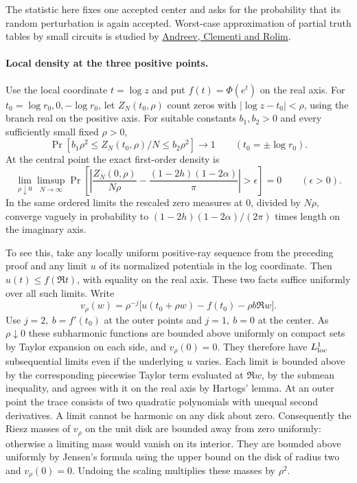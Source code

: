The statistic here fixes one accepted center and asks for the probability that its random perturbation is again accepted. Worst-case approximation of partial truth tables by small circuits is studied by \href{https://eccc.weizmann.ac.il/eccc-reports/1995/TR95-041/index.html}{Andreev, Clementi and Rolim}.

\paragraph{Local density at the three positive points.}
Use the local coordinate \(t=\log z\) and put \(f(t)=\Phi(e^t)\) on the real axis. For \(t_0=\log r_0,0,-\log r_0\), let \(Z_N(t_0,\rho)\) count zeros with \(|\log z-t_0|<\rho\), using the branch real on the positive axis. For suitable constants \(b_1,b_2>0\) and every sufficiently small fixed \(\rho>0\),
\[
 \Pr\!\left[b_1\rho^2\le Z_N(t_0,\rho)/N\le b_2\rho^2\right]\longrightarrow1
 \qquad(t_0=\pm\log r_0).
\]
At the central point the exact first-order density is
\[
 \lim_{\rho\downarrow0}\limsup_{N\to\infty}
 \Pr\!\left[\left|\frac{Z_N(0,\rho)}{N\rho}
            -\frac{(1-2h)(1-2\alpha)}{\pi}\right|>\epsilon\right]=0
 \qquad(\epsilon>0).
\]
In the same ordered limits the rescaled zero measures at \(0\), divided by \(N\rho\), converge vaguely in probability to \((1-2h)(1-2\alpha)/(2\pi)\) times length on the imaginary axis.

To see this, take any locally uniform positive-ray sequence from the preceding proof and any limit \(u\) of its normalized potentials in the log coordinate. Then \(u(t)\le f(\Re t)\), with equality on the real axis. These two facts suffice uniformly over all such limits. Write
\[
 v_\rho(w)=\rho^{-j}\big[u(t_0+\rho w)-f(t_0)-\rho b\Re w\big].
\]
Use \(j=2,\ b=f'(t_0)\) at the outer points and \(j=1,\ b=0\) at the center. As \(\rho\downarrow0\) these subharmonic functions are bounded above uniformly on compact sets by Taylor expansion on each side, and \(v_\rho(0)=0\). They therefore have \(L^1_{\rm loc}\) subsequential limits even if the underlying \(u\) varies. Each limit is bounded above by the corresponding piecewise Taylor term evaluated at \(\Re w\), by the submean inequality, and agrees with it on the real axis by Hartogs' lemma. At an outer point the trace consists of two quadratic polynomials with unequal second derivatives. A limit cannot be harmonic on any disk about zero. Consequently the Riesz masses of \(v_\rho\) on the unit disk are bounded away from zero uniformly: otherwise a limiting mass would vanish on its interior. They are bounded above uniformly by Jensen's formula using the upper bound on the disk of radius two and \(v_\rho(0)=0\). Undoing the scaling multiplies these masses by \(\rho^2\).

